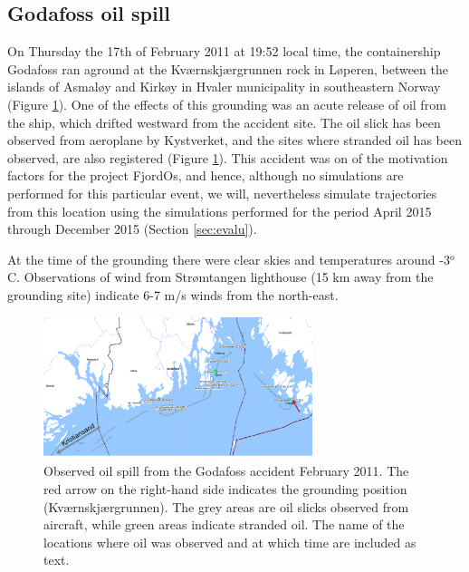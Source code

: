 \subsection{Godafoss oil spill}
\label{sect:godafoss_obs}
On Thursday the 17th of February 2011 at 19:52 local time, the containership Godafoss ran aground at the Kv{\ae}rnskj{\ae}rgrunnen rock in L{\o}peren, between the islands of Asmal{\o}y and Kirk{\o}y in Hvaler municipality in southeastern Norway (Figure \ref{fig:godafoss_oil}). One of the effects of this grounding was an acute release of oil from the ship, which drifted westward from the accident site. The oil slick has been observed from aeroplane by Kystverket, and the sites where stranded oil has been observed, are also registered (Figure \ref{fig:godafoss_oil}). This accident was on of the motivation factors for the project FjordOs, and hence, although no simulations are performed for this particular event, we will, nevertheless simulate trajectories from this location using the simulations performed for the period April 2015 through December 2015 (Section \ref{sec:evalu}). 

At the time of the grounding there were clear skies and temperatures around -3$^o$C. Observations of wind from Str{\o}mtangen lighthouse (15 km away from the grounding site) indicate 6-7 m/s winds from the north-east.

\begin{figure}[ht]
	\centerline{ \includegraphics*[width=0.7\textwidth]{Figurer/Godafoss} }
	\caption{\small Observed oil spill from the Godafoss accident February 2011. The red arrow on the right-hand side indicates the grounding position (Kv{\ae}rnskj{\ae}rgrunnen). The grey areas are oil slicks observed from aircraft, while green areas indicate stranded oil. The name of the locations where oil was observed and at which time are included as text.}
	\label{fig:godafoss_oil}
\end{figure}


